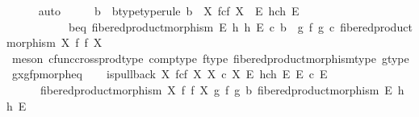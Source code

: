 \begin{isabellebody}
\ \ \ \ \isamarkupfalse%
\ auto\isanewline
\ \ \isamarkupfalse%
\ \isamarkupfalse%
\ b\ \ b{\isacharunderscore}{\kern0pt}type{\isacharbrackleft}{\kern0pt}type{\isacharunderscore}{\kern0pt}rule{\isacharbrackright}{\kern0pt}{\isacharcolon}{\kern0pt}\ {\isachardoublequoteopen}b\ {\isacharcolon}{\kern0pt}\ X\ \isactrlbsub f\isactrlesub {\isasymtimes}\isactrlsub c\isactrlbsub f\isactrlesub \ X\ {\isasymrightarrow}\ E\ \isactrlbsub h\isactrlesub {\isasymtimes}\isactrlsub c\isactrlbsub h\isactrlesub \ E{\isachardoublequoteclose}\isanewline
\ \ \ \ \ \ \ \ \ \ \ b{\isacharunderscore}{\kern0pt}eq{\isacharcolon}{\kern0pt}\ {\isachardoublequoteopen}fibered{\isacharunderscore}{\kern0pt}product{\isacharunderscore}{\kern0pt}morphism\ E\ h\ h\ E\ {\isasymcirc}\isactrlsub c\ b\ {\isacharequal}{\kern0pt}\ {\isacharparenleft}{\kern0pt}g\ {\isasymtimes}\isactrlsub f\ g{\isacharparenright}{\kern0pt}\ {\isasymcirc}\isactrlsub c\ fibered{\isacharunderscore}{\kern0pt}product{\isacharunderscore}{\kern0pt}morphism\ X\ f\ f\ X{\isachardoublequoteclose}\isanewline
\ \ \ \ \isamarkupfalse%
\ {\isacharparenleft}{\kern0pt}meson\ cfunc{\isacharunderscore}{\kern0pt}cross{\isacharunderscore}{\kern0pt}prod{\isacharunderscore}{\kern0pt}type\ comp{\isacharunderscore}{\kern0pt}type\ f{\isacharunderscore}{\kern0pt}type\ fibered{\isacharunderscore}{\kern0pt}product{\isacharunderscore}{\kern0pt}morphism{\isacharunderscore}{\kern0pt}type\ g{\isacharunderscore}{\kern0pt}type\ gxg{\isacharunderscore}{\kern0pt}fpmorph{\isacharunderscore}{\kern0pt}eq{\isacharparenright}{\kern0pt}\isanewline
\isanewline
\ \ \isamarkupfalse%
\ {\isachardoublequoteopen}is{\isacharunderscore}{\kern0pt}pullback\ {\isacharparenleft}{\kern0pt}X\ \isactrlbsub f\isactrlesub {\isasymtimes}\isactrlsub c\isactrlbsub f\isactrlesub \ X{\isacharparenright}{\kern0pt}\ {\isacharparenleft}{\kern0pt}X\ {\isasymtimes}\isactrlsub c\ X{\isacharparenright}{\kern0pt}\ {\isacharparenleft}{\kern0pt}E\ \isactrlbsub h\isactrlesub {\isasymtimes}\isactrlsub c\isactrlbsub h\isactrlesub \ E{\isacharparenright}{\kern0pt}\ {\isacharparenleft}{\kern0pt}E\ {\isasymtimes}\isactrlsub c\ E{\isacharparenright}{\kern0pt}\isanewline
\ \ \ \ \ \ {\isacharparenleft}{\kern0pt}fibered{\isacharunderscore}{\kern0pt}product{\isacharunderscore}{\kern0pt}morphism\ X\ f\ f\ X{\isacharparenright}{\kern0pt}\ {\isacharparenleft}{\kern0pt}g\ {\isasymtimes}\isactrlsub f\ g{\isacharparenright}{\kern0pt}\ b\ {\isacharparenleft}{\kern0pt}fibered{\isacharunderscore}{\kern0pt}product{\isacharunderscore}{\kern0pt}morphism\ E\ h\ h\ E{\isacharparenright}{\kern0pt}{\isachardoublequoteclose}\isanewline

\end{isabellebody}
